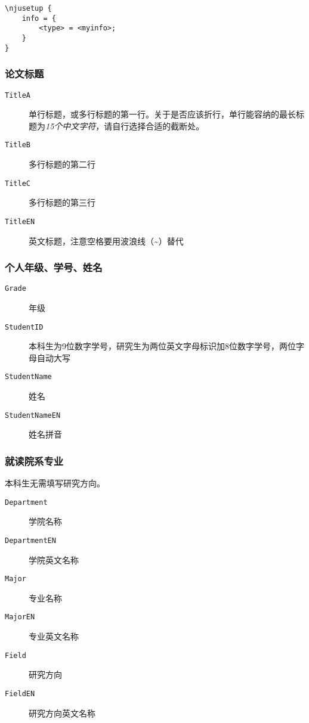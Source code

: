 \begin{lstlisting}
\njusetup {
    info = {
        <type> = <myinfo>; 
    }
}
\end{lstlisting}

\subsubsection{论文标题}
\begin{description}
    \item[\texttt{TitleA}] 单行标题，或多行标题的第一行。关于是否应该折行，单行能容纳的最长标题为\emph{15个中文字符}，请自行选择合适的截断处。
    \item[\texttt{TitleB}] 多行标题的第二行
    \item[\texttt{TitleC}] 多行标题的第三行
    \item[\texttt{TitleEN}] 英文标题，注意空格要用波浪线（\textasciitilde）替代
\end{description}

\subsubsection{个人年级、学号、姓名}
\begin{description}
    \item[\texttt{Grade}] 年级
    \item[\texttt{StudentID}] 本科生为9位数字学号，研究生为两位英文字母标识加8位数字学号，两位字母自动大写
    \item[\texttt{StudentName}] 姓名
    \item[\texttt{StudentNameEN}] 姓名拼音 
\end{description}

\subsubsection{就读院系专业}

本科生无需填写研究方向。
\begin{description}
    \item[\texttt{Department}] 学院名称
    \item[\texttt{DepartmentEN}] 学院英文名称
    \item[\texttt{Major}] 专业名称
    \item[\texttt{MajorEN}] 专业英文名称
    \item[\texttt{Field}] 研究方向
    \item[\texttt{FieldEN}] 研究方向英文名称
\end{description}

